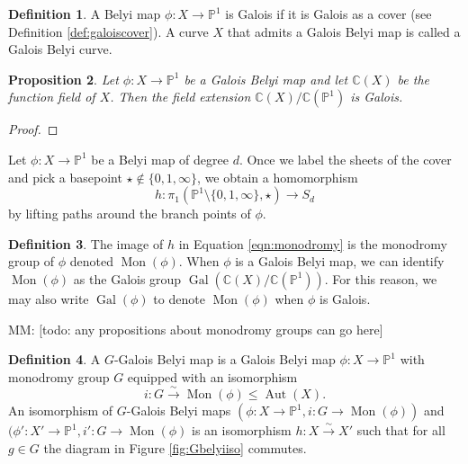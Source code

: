 \documentclass{dcthesis}
\newcommand{\PP}{\mathbb P}
\newcommand{\CC}{\mathbb C}
\newcommand{\defi}[1]{\textsf{#1}}
\newcommand{\mm}[1]{{\color{blue} \sf MM: [#1]}}
\DeclareMathOperator{\Aut}{Aut}
\DeclareMathOperator{\Mon}{Mon}
\DeclareMathOperator{\Gal}{Gal}
\newtheorem{prop}{Proposition}[section]
\theoremstyle{definition}
\newtheorem{definition}[prop]{Definition}
\theoremstyle{remark}
\numberwithin{equation}{section}
\numberwithin{figure}{section}
\begin{document}
{{{      \begin{definition}\label{def:galoisbelyi}
        A Belyi map $\phi\colon X\to\PP^1$
        is \defi{Galois}
        if it is Galois as a cover
        (see Definition \ref{def:galoiscover}).
        A curve $X$ that admits a Galois Belyi map
        is called a \defi{Galois Belyi curve}.
      \end{definition}
      \begin{prop}\label{prop:galoiscover}
        Let $\phi\colon X\to\PP^1$ be a Galois Belyi map
        and let $\CC(X)$ be the function field of $X$.
        Then the field extension
        $\CC(X)/\CC(\PP^1)$ is Galois.
      \end{prop}
      \begin{proof}
      \end{proof}
      Let $\phi\colon X\to\PP^1$ be a Belyi map of degree $d$.
      Once we label the sheets of the cover
      and pick a basepoint $\star\not\in\{0,1,\infty\}$,
      we obtain a homomorphism
      \begin{equation}\label{eqn:monodromy}
        h\colon\pi_1(\PP^1\setminus\{0,1,\infty\},\star)\to S_d
      \end{equation}
      by lifting paths around the branch points of $\phi$.
      \begin{definition}\label{def:monodromy}
        The image of $h$ in Equation \ref{eqn:monodromy}
        is the \defi{monodromy group} of $\phi$
        denoted $\Mon(\phi)$.
        When $\phi$ is a Galois Belyi map,
        we can identify $\Mon(\phi)$
        as the Galois group
        $\Gal(\CC(X)/\CC(\PP^1))$.
        For this reason,
        we may also write $\Gal(\phi)$
        to denote $\Mon(\phi)$ when $\phi$
        is Galois.
      \end{definition}
      \mm{todo: any propositions about monodromy groups can go here}
      \begin{definition}\label{def:Gbelyi}
        A \defi{$G$-Galois Belyi map}
        is a Galois Belyi map
        $\phi\colon X\to\PP^1$
        with monodromy group $G$
        equipped with an isomorphism
        \[
          i\colon G\stackrel{\sim}{\to}\Mon(\phi)\leq\Aut(X).
        \]
        An \defi{isomorphism of $G$-Galois Belyi maps}
        $(\phi\colon X\to\PP^1, i\colon G\to\Mon(\phi))$
        and
        $(\phi'\colon X'\to\PP^1, i'\colon G\to\Mon(\phi)$
        is an isomorphism $h\colon X\stackrel{\sim}{\to} X'$ such that
        for all $g\in G$
        the diagram in
        Figure \ref{fig:Gbelyiiso} commutes.

\end{definition}}}}
\end{document}
